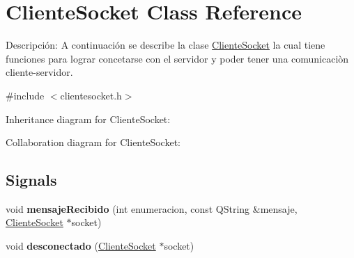 \hypertarget{class_cliente_socket}{}\section{Cliente\+Socket Class Reference}
\label{class_cliente_socket}


Descripción\+: A continuación se describe la clase \hyperlink{class_cliente_socket}{Cliente\+Socket} la cual tiene funciones para lograr concetarse con el servidor y poder tener una comunicaciòn cliente-\/servidor.  




{\ttfamily \#include $<$clientesocket.\+h$>$}



Inheritance diagram for Cliente\+Socket\+:


Collaboration diagram for Cliente\+Socket\+:
\subsection*{Signals}
\begin{DoxyCompactItemize}
\item 
\mbox{\label{class_cliente_socket_a85bb0acefb353f0cd8ab799e8837031c}} 
void {\bfseries mensaje\+Recibido} (int enumeracion, const Q\+String \&mensaje, \hyperlink{class_cliente_socket}{Cliente\+Socket} $\ast$socket)
\item 
\mbox{\label{class_cliente_socket_a9b3fe9b9c512e91b90c8aa86b4ee14e9}} 
void {\bfseries desconectado} (\hyperlink{class_cliente_socket}{Cliente\+Socket} $\ast$socket)
\end{DoxyCompactItemize}
